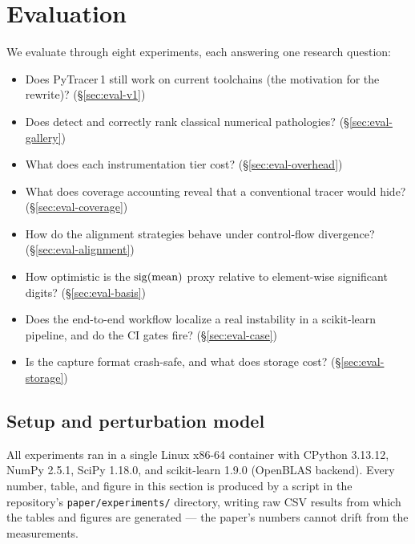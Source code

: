 \section{Evaluation}
\label{sec:eval}

We evaluate \pyt{} through eight experiments, each answering one research
question:

\begin{itemize}
\item[\textbf{E0}] Does PyTracer\,1 still work on current toolchains
  (the motivation for the rewrite)? (\S\ref{sec:eval-v1})
\item[\textbf{E1}] Does \pyt{} detect and correctly rank classical
  numerical pathologies? (\S\ref{sec:eval-gallery})
\item[\textbf{E2}] What does each instrumentation tier cost?
  (\S\ref{sec:eval-overhead})
\item[\textbf{E3}] What does coverage accounting reveal that a
  conventional tracer would hide? (\S\ref{sec:eval-coverage})
\item[\textbf{E4}] How do the alignment strategies behave under
  control-flow divergence? (\S\ref{sec:eval-alignment})
\item[\textbf{E5}] How optimistic is the $\operatorname{sig}(\mathrm{mean})$ proxy
  relative to element-wise significant digits? (\S\ref{sec:eval-basis})
\item[\textbf{E6}] Does the end-to-end workflow localize a real
  instability in a scikit-learn pipeline, and do the CI gates fire?
  (\S\ref{sec:eval-case})
\item[\textbf{E7}] Is the capture format crash-safe, and what does
  storage cost? (\S\ref{sec:eval-storage})
\end{itemize}

\subsection{Setup and perturbation model}
\label{sec:eval-setup}

All experiments ran in a single Linux x86-64 container with CPython
3.13.12, NumPy 2.5.1, SciPy 1.18.0, and scikit-learn 1.9.0 (OpenBLAS
backend). Every number, table, and figure in this section is produced by
a script in the repository's \texttt{paper/experiments/} directory,
writing raw CSV results from which the tables and figures are generated
--- the paper's numbers cannot drift from the measurements.

